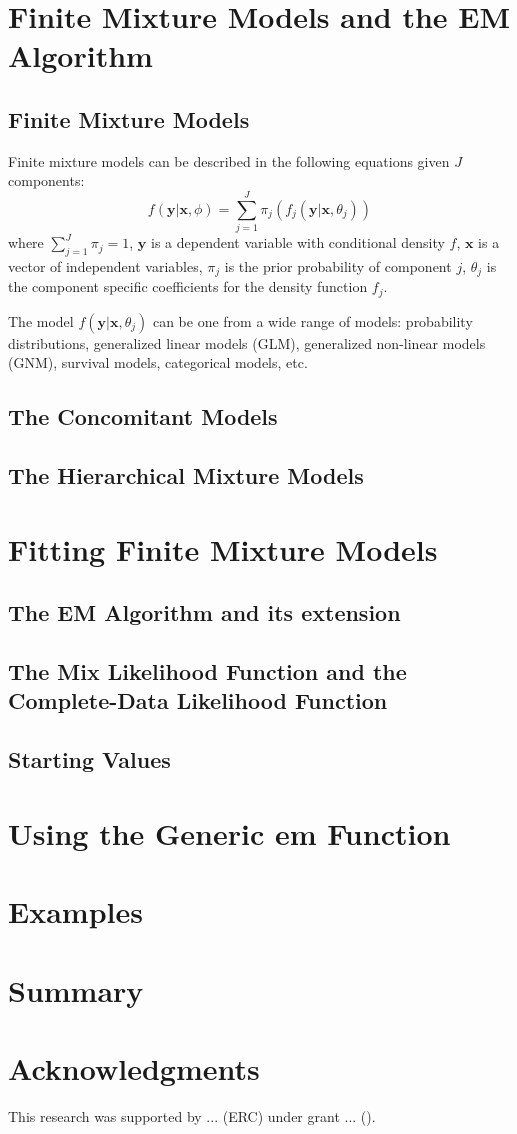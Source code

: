 \documentclass[nojss]{jss}
\begin{document}
   \section{Finite Mixture Models and the EM Algorithm}
      \subsection{Finite Mixture Models}
	      Finite mixture models can be described in the following equations given $J$ components:
      \begin{equation}
	      f(\mathbf{y}|\mathbf{x},\phi) = \sum_{j=1}^J \pi_j(f_j(\mathbf{y}|\mathbf{x}, \theta_j))
	    \end{equation}
	    where $\sum_{j=1}^J \pi_j = 1$,  $\mathbf{y}$ is a dependent variable with conditional density $f$,  $\mathbf{x}$ is a vector of independent variables, $\pi_j$ is the prior probability of component $j$,  $\theta_j$ is the component specific coefficients for the density function $f_j$.

The model $f(\mathbf{y}|\mathbf{x}, \theta_j)$ can be one from a wide range of models: probability distributions, generalized linear models (GLM), generalized non-linear models (GNM),  survival models,  categorical models, etc. %
      \subsection{The Concomitant Models}
      \subsection{The Hierarchical Mixture Models}
   \section{Fitting Finite Mixture Models}
      \subsection{The EM Algorithm and its extension}
      \subsection{The Mix Likelihood Function and the Complete-Data Likelihood Function}
      \subsection{Starting Values}
   \section{Using the Generic em Function}
   \section{Examples}
   \section{Summary}
   \section{Acknowledgments}
   This research was supported by ... (ERC) under grant ... (). 
   
\end{document}
